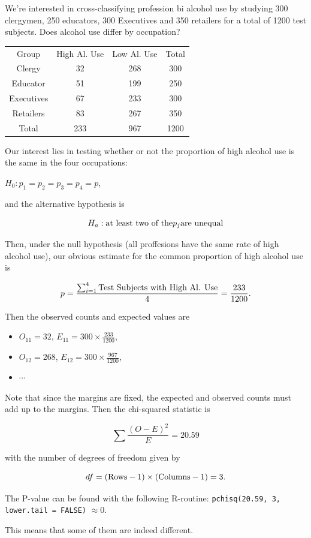 \documentclass{homework}
\begin{document}
\begin{tcolorbox}[title=Example 2 of Independence Testing]

We're interested in cross-classifying profession bi alcohol use by studying 300 clergymen, 250 educators, 300 Executives and 350 retailers for a total of 1200 test subjects. Does alcohol use differ by occupation?

\begin{center}
\begin{tabular}{ |c|c|c|c| } 
 \hline
 Group & High Al. Use & Low Al. Use & Total \\
 Clergy & 32 &  268 & 300 \\ 
 Educator & 51 & 199& 250 \\ 
 Executives & 67 & 233 & 300 \\
 Retailers & 83 &267 & 350 \\
 Total & 233 & 967 & 1200
\end{tabular}
\end{center}

Our interest lies in testing whether or not the proportion of high alcohol use is the same in the four occupations: 

$H_0 : p_1=p_2=p_3=p_4=p$,

and the alternative hypothesis is 

$$
H_a : \textnormal{at least two of the} p_j \textnormal{are unequal}
$$

Then, under the null hypothesis (all proffesions have the same rate of high alcohol use), our obvious estimate for the common proportion of high alcohol use is 

$$
p = \frac{\sum_{i=1}^4\textnormal{Test Subjects with High Al. Use}}{4} =\frac{233}{1200}.
$$

Then the observed counts and expected values are 

\begin{itemize}
    \item $O_{11} = 32$, $E_{11} = 300 \times \frac{233}{1200}$, \\
    \item $O_{12} = 268$, $E_{12} = 300 \times \frac{967}{1200}$,
    \item $\cdots$
\end{itemize}

Note that since the margins are fixed, the expected and observed counts must add up to the margins. Then the chi-squared statistic is 

$$
\sum \frac{(O-E)^2}{E} = 20.59
$$

with the number of degrees of freedom given by

$$
df = (\textnormal{Rows} - 1) \times (\textnormal{Columns} - 1) = 3.
$$

The P-value can be found with the following R-routine: \texttt{pchisq(20.59, 3, lower.tail = FALSE)} $\approx 0$.

This means that some of them are indeed different. 
\end{tcolorbox}
\end{document}
